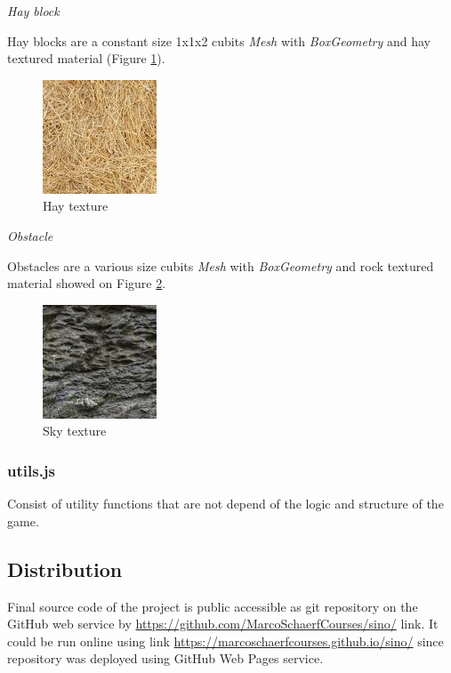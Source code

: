 \documentclass[12pt]{article}
\begin{document}
\textit{Hay block}
\par
Hay blocks are a constant size 1x1x2 cubits \textit{Mesh} with \textit{BoxGeometry} and hay textured material (Figure \ref{hay1}).

\begin{figure}[h!]
\begin{center}
\includegraphics[scale=1.0]{../images/hay.jpg}
\end{center}
\caption{Hay texture}
\label{hay1}
\end{figure}

\textit{Obstacle}
\par
Obstacles are a various size cubits \textit{Mesh} with \textit{BoxGeometry} and rock textured material showed on Figure \ref{obst1}.

\begin{figure}[h!]
\begin{center}
\includegraphics[scale=1.0]{../images/rock.jpg}
\end{center}
\caption{Sky texture}
\label{obst1}
\end{figure}

\subsubsection{utils.js}
Consist of utility functions that are not depend of the logic and structure of the game.
\subsection{Distribution}
Final source code of the project is public accessible as git repository on the GitHub web service by \url{https://github.com/MarcoSchaerfCourses/sino/} link. It could be run online using link \url{https://marcoschaerfcourses.github.io/sino/} since repository was deployed using GitHub Web Pages service.
\newpage
\end{document}
